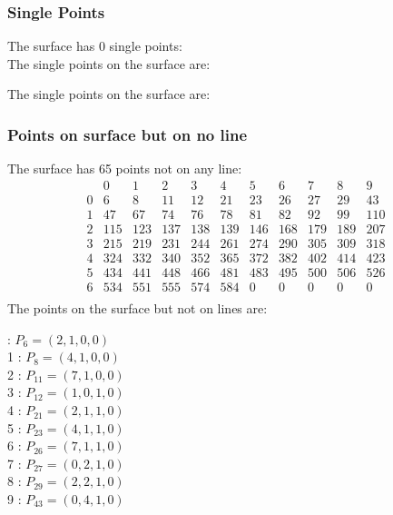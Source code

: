 \documentclass{article}
\begin{document}
{\subsubsection*{Single Points}
The surface has 0 single points:\\
The single points on the surface are:\\
\begin{multicols}{2}
\noindent
\end{multicols}
The single points on the surface are:\\
\subsubsection*{Points on surface but on no line}
The surface has 65 points not on any line:\\
$$
\begin{array}{r|*{10}{r}}
 & 0 & 1 & 2 & 3 & 4 & 5 & 6 & 7 & 8 & 9\\
\hline
0 & 6 & 8 & 11 & 12 & 21 & 23 & 26 & 27 & 29 & 43\\
1 & 47 & 67 & 74 & 76 & 78 & 81 & 82 & 92 & 99 & 110\\
2 & 115 & 123 & 137 & 138 & 139 & 146 & 168 & 179 & 189 & 207\\
3 & 215 & 219 & 231 & 244 & 261 & 274 & 290 & 305 & 309 & 318\\
4 & 324 & 332 & 340 & 352 & 365 & 372 & 382 & 402 & 414 & 423\\
5 & 434 & 441 & 448 & 466 & 481 & 483 & 495 & 500 & 506 & 526\\
6 & 534 & 551 & 555 & 574 & 584 & 0 & 0 & 0 & 0 & 0\\
\end{array}
$$
The points on the surface but not on lines are:\\
\begin{multicols}{2}
 : $P_{6}=( 2, 1, 0, 0 )$\\
1 : $P_{8}=( 4, 1, 0, 0 )$\\
2 : $P_{11}=( 7, 1, 0, 0 )$\\
3 : $P_{12}=( 1, 0, 1, 0 )$\\
4 : $P_{21}=( 2, 1, 1, 0 )$\\
5 : $P_{23}=( 4, 1, 1, 0 )$\\
6 : $P_{26}=( 7, 1, 1, 0 )$\\
7 : $P_{27}=( 0, 2, 1, 0 )$\\
8 : $P_{29}=( 2, 2, 1, 0 )$\\
9 : $P_{43}=( 0, 4, 1, 0 )$\\

\end{multicols}}
\end{document}

